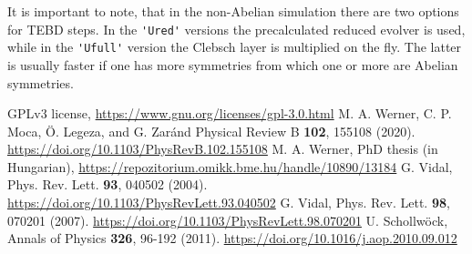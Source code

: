 \documentclass[aps,prb,twocolumn,showpacs,preprintnumbers,amsmath,amssymb, superscriptaddressm, nofootinbib]{revtex4-2}   %
\begin{document}
It is important to note, that in the non-Abelian simulation there are two options for TEBD steps. In the \verb|'Ured'| versions the precalculated reduced evolver is used, while in the \verb|'Ufull'| version the Clebsch layer is multiplied on the fly. The latter is usually faster if one has more symmetries from which one or more are Abelian symmetries.




\begin{thebibliography}{99}
 GPLv3 license, \url{https://www.gnu.org/licenses/gpl-3.0.html}
 M. A.  Werner, C. P.  Moca, \"O. Legeza, and G. Zar\'and
Physical Review B \textbf{102}, 155108 (2020). \url{https://doi.org/10.1103/PhysRevB.102.155108}
 M. A. Werner, PhD thesis (in Hungarian), \url{https://repozitorium.omikk.bme.hu/handle/10890/13184}
 G. Vidal, Phys. Rev. Lett. \textbf{93}, 040502 (2004). \url{https://doi.org/10.1103/PhysRevLett.93.040502}
 G. Vidal, Phys. Rev. Lett. \textbf{98}, 070201 (2007). \url{https://doi.org/10.1103/PhysRevLett.98.070201}
 U. Schollwöck, Annals of Physics \textbf{326}, 96-192 (2011).  \url{https://doi.org/10.1016/j.aop.2010.09.012}
\end{thebibliography}
\end{document}
